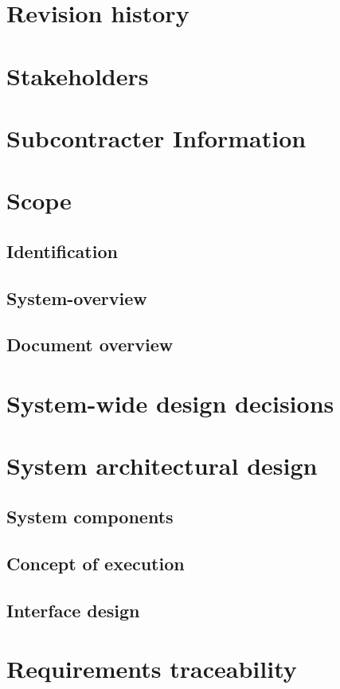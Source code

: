 \documentclass[a4paper, oneside, 11pt]{article}
\begin{document}

\addtolength{\topmargin}{-2cm}
\tableofcontents

\noindent
\section{Revision history}

\section{Stakeholders}

\section{Subcontracter Information}

\section{Scope}

\subsection{Identification}

\subsection{System-overview}

\subsection{Document overview}

\section{System-wide design decisions}

\section{System architectural design}

\subsection{System components}

\subsection{Concept of execution}

\subsection{Interface design}

\section{Requirements traceability}

\end{document}
